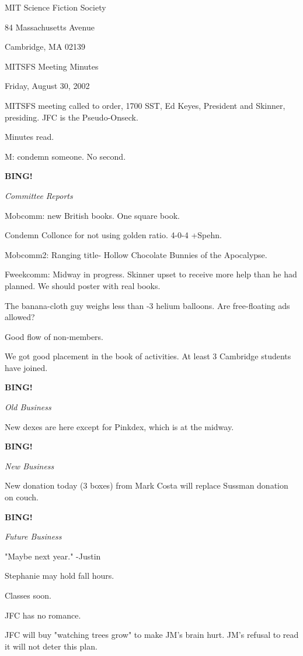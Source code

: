 \documentclass[12pt]{article}
\newcommand{\bing}{{\bf BING!} }
\newcommand{\goto}[1]{\bing \vskip 12pt \centerline{{\em{#1}}}}
\begin{document}
\begin{center}

MIT Science Fiction Society 

84 Massachusetts Avenue

Cambridge, MA 02139

\vspace{12pt}

MITSFS Meeting Minutes 

Friday, August 30, 2002

\end{center}
 
\vspace{18pt}

\setlength{\parskip}{6pt}

\noindent
MITSFS meeting called to order, 1700 SST, Ed Keyes, President and Skinner, presiding. JFC is the Pseudo-Onseck.

Minutes read.

M: condemn someone. No second.

\goto{Committee Reports}

Mobcomm: new British books. One square book.

Condemn Collonce for not using golden ratio. 4-0-4 +Spehn.

Mobcomm2: Ranging title- Hollow Chocolate Bunnies of the Apocalypse.

Fweekcomm: Midway in progress. Skinner upset to receive more help than he had planned. We should poster with real books.

The banana-cloth guy weighs less than -3 helium balloons. Are free-floating ads allowed?

Good flow of non-members.

We got good placement in the book of activities. At least 3 Cambridge students have joined.

\goto{Old Business}

New dexes are here except for Pinkdex, which is at the midway.

\goto{New Business}

New donation today (3 boxes) from Mark Costa will replace Sussman donation on couch.

\goto{Future Business}

"Maybe next year." -Justin

Stephanie may hold fall hours.

Classes soon.

JFC has no romance.

JFC will buy "watching trees grow" to make JM's brain hurt. JM's refusal to read it will not deter this plan.
\end{document}
